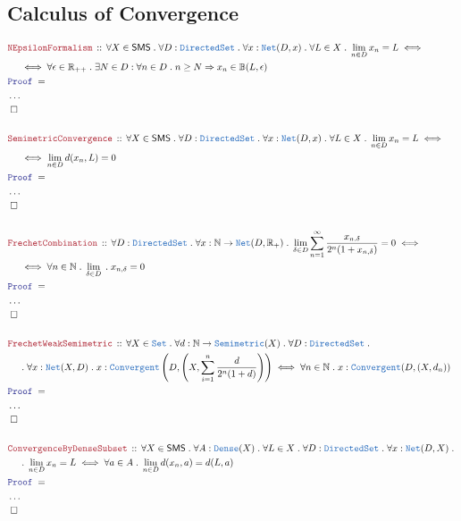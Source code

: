 \documentclass[12pt]{scrartcl}
\newcommand{\TYPE}[1]{\textcolor{NavyBlue}{\mathtt{#1}}}
\newcommand{\LOGIC}[1]{\textcolor{Blue}{\mathtt{#1}}}
\newcommand{\THM}[1]{\textcolor{Maroon}{\mathtt{#1}}}
\renewcommand{\.}{\; . \;}
\newcommand{\Theorem}[2]{& \THM{#1} \, :: \, #2 \\ & \Proof = \\ }
\newcommand{\NewLine}{\\ & \kern 1pc}
\newcommand{\Page}[1]{ \begin{align*} #1 \end{align*}   }
\newcommand{\NoProof}{ & \ldots \\ \EndProof}
\newcommand{\Imply}{\Rightarrow}
\newcommand{\Reals}{\mathbb{R} }
\newcommand{\Nat}{\mathbb{N} }
\newcommand{\Set}{\TYPE{Set}}
\newcommand{\QED}{\; \square}
\newcommand{\EndProof}{& \QED \\}
\newcommand{\Proof}{\LOGIC{Proof} \; }
\newcommand{\SMS}{\mathsf{SMS}}
\begin{document}
\subsection{Calculus of Convergence}
\Page{
	\Theorem{NEpsilonFormalism}
	{
		\forall X \in \SMS \. \forall D : \TYPE{DirectedSet} \. \forall  x : \TYPE{Net}(D,x) \. \forall L \in X  \.
		\lim_{n \in D} x_n = L \iff \NewLine \iff \forall \epsilon \in \Reals_{++} \. \exists N \in D : \forall n \in D \. 
		n \ge N \Imply  x_n \in \mathbb{B}(L,\epsilon)
	}
	\NoProof
	\\
	\Theorem{SemimetricConvergence}
	{
		\forall X \in \SMS \. \forall D : \TYPE{DirectedSet} \. \forall x : \TYPE{Net}(D,x) \. \forall L \in X \.
		\lim_{n \in D} x_n = L  \iff \NewLine \iff \lim_{n \in D} d(x_n,L) = 0 
	}
	\NoProof
	\\
	\Theorem{FrechetCombination}
	{
	  	\forall  D : \TYPE{DirectedSet} \. \forall x : \Nat \to \TYPE{Net}(D,\Reals_+) \. 
		\lim_{\delta \in D} \sum^\infty_{n=1} \frac{x_{n.\delta}}{2^n(1 + x_{n,\delta})} = 0 \iff \NewLine \iff \forall  n \in \Nat \. \lim_{\delta \in D} \. x_{n,\delta} = 0		  	
	}
	\NoProof
	\\
	\Theorem{FrechetWeakSemimetric}
	{
		\forall X \in \Set \. \forall d : \Nat \to \TYPE{Semimetric}(X) \. \forall D : \TYPE{DirectedSet} \.  \NewLine \. \forall x : \TYPE{Net}(X,D) \.
		x : \TYPE{Convergent}\left(D,\left(X, \sum^n_{i=1} \frac{d}{2^n(1 + d)}\right)\right) \iff \forall n \in \Nat \. x : \TYPE{Convergent}(D,(X,d_n))
	}
	\NoProof
	\\
	\Theorem{ConvergenceByDenseSubset}
	{
		\forall X \in \SMS \. \forall A : \TYPE{Dense}(X) \. \forall L \in X \.  \forall D : \TYPE{DirectedSet} \. 
		\forall x  : \TYPE{Net}(D,X) \. \NewLine \. \lim_{n \in D} x_n = L \iff \forall a \in A \. \lim_{n \in D} d(x_n,a) = d(L,a)
	}
	\NoProof
}
\newpage
\end{document}
